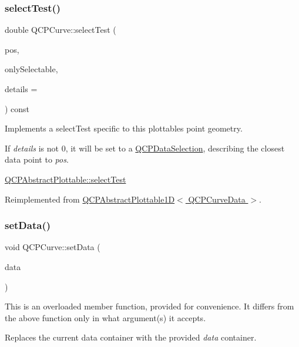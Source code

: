 \subsubsection{\texorpdfstring{select\+Test()}{selectTest()}}
{\footnotesize\ttfamily double Q\+C\+P\+Curve\+::select\+Test (\begin{DoxyParamCaption}\item[{const Q\+PointF \&}]{pos,  }\item[{bool}]{only\+Selectable,  }\item[{Q\+Variant $\ast$}]{details = {} }\end{DoxyParamCaption}) const\hspace{0.3cm}{\ttfamily [virtual]}}

Implements a select\+Test specific to this plottable\textquotesingle{}s point geometry.

If {\itshape details} is not 0, it will be set to a \hyperlink{classQCPDataSelection}{Q\+C\+P\+Data\+Selection}, describing the closest data point to {\itshape pos}.

\hyperlink{classQCPAbstractPlottable_addb3f5c41f007a78c3e142cc605bc712}{Q\+C\+P\+Abstract\+Plottable\+::select\+Test} 

Reimplemented from \hyperlink{classQCPAbstractPlottable1D_a4611b43bcb6441b2154eb4f4e0a33db2}{Q\+C\+P\+Abstract\+Plottable1\+D$<$ Q\+C\+P\+Curve\+Data $>$}.

\mbox{\label{classQCPCurve_a41246850d2e080bc57183ca19cd4135e}} 
\subsubsection{\texorpdfstring{set\+Data()}{setData()}\hspace{0.1cm}{\footnotesize\ttfamily [1/3]}}
{\footnotesize\ttfamily void Q\+C\+P\+Curve\+::set\+Data (\begin{DoxyParamCaption}\item[{Q\+Shared\+Pointer$<$ \hyperlink{classQCPDataContainer}{Q\+C\+P\+Curve\+Data\+Container} $>$}]{data }\end{DoxyParamCaption})}

This is an overloaded member function, provided for convenience. It differs from the above function only in what argument(s) it accepts.

Replaces the current data container with the provided {\itshape data} container.

